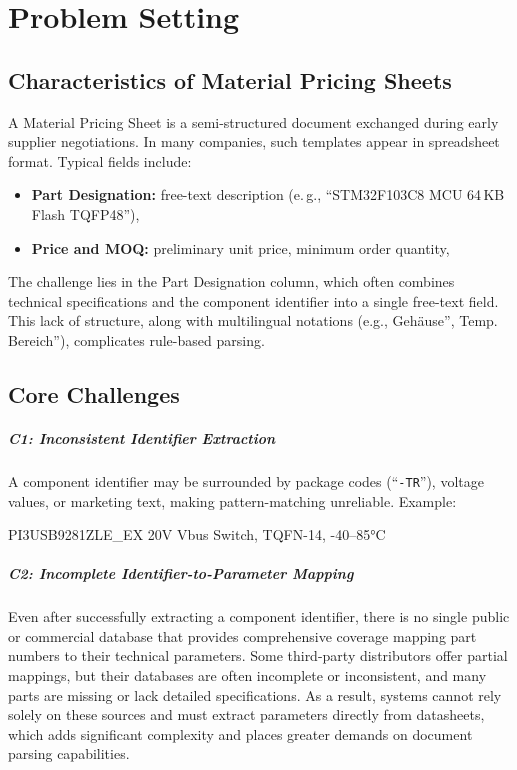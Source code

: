 \chapter{Problem Setting}
\label{chapter:problem}

\section{Characteristics of Material Pricing Sheets}
A Material Pricing Sheet is a semi-structured document exchanged during early supplier negotiations.  
In many companies, such templates appear in spreadsheet format.  
Typical fields include:  

\begin{itemize}
  \item \textbf{Part Designation:} free-text description (e.\,g., ``STM32F103C8 MCU 64\,KB Flash TQFP48''),
  \item \textbf{Price and MOQ:} preliminary unit price, minimum order quantity,
\end{itemize}

The challenge lies in the Part Designation column, which often combines technical specifications and the component identifier into a single free-text field.
This lack of structure, along with multilingual notations (e.g., Gehäuse'', Temp. Bereich''), complicates rule-based parsing.

\section{Core Challenges}
\paragraph{C1: Inconsistent Identifier Extraction}  
A component identifier may be surrounded by package codes (``\texttt{-TR}''), voltage values, or marketing text, making pattern-matching unreliable.  
Example:  
\begin{center}
\ttfamily PI3USB9281ZLE\_EX   20V Vbus Switch, TQFN-14, -40–85°C
\end{center}

\paragraph{C2: Incomplete Identifier-to-Parameter Mapping}
Even after successfully extracting a component identifier, there is no single public or commercial database that provides comprehensive coverage mapping part numbers to their technical parameters. Some third-party distributors offer partial mappings, but their databases are often incomplete or inconsistent, and many parts are missing or lack detailed specifications. As a result, systems cannot rely solely on these sources and must extract parameters directly from datasheets, which adds significant complexity and places greater demands on document parsing capabilities.

